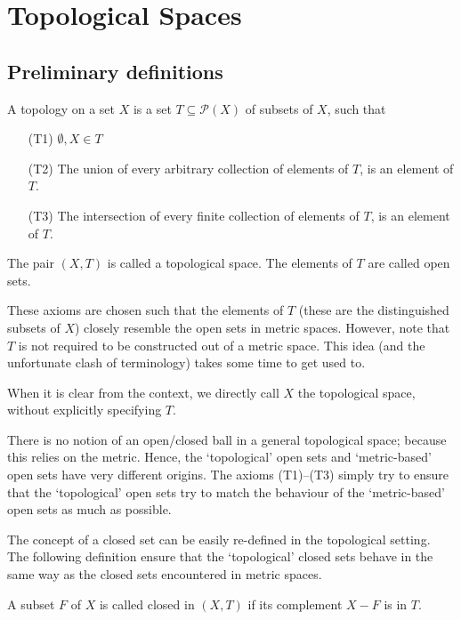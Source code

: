 \section{Topological Spaces}

\subsection{Preliminary definitions}
\begin{ndfn}
  A topology on a set $X$ is a set $T \subseteq \mathcal{P}(X)$ of subsets of $X$, such that
  \begin{enumerate}
  \item[(T1)] $\emptyset, X \in T$
  \item[(T2)] The union of every arbitrary collection of elements of $T$, is an element of $T$.
  \item[(T3)] The intersection of every finite collection of elements of $T$, is an element of $T$.
  \end{enumerate}
  The pair $(X,T)$ is called a topological space. The elements of $T$ are called open sets.
\end{ndfn}

These axioms are chosen such that the elements of $T$ (these are the distinguished subsets of $X$) closely resemble the open sets in metric spaces. However, note that $T$ is not required to be constructed out of a metric space. This idea (and the unfortunate clash of terminology) takes some time to get used to.

\begin{remark}
  When it is clear from the context, we directly call $X$ the topological space, without explicitly specifying $T$.
\end{remark}

\begin{remark}
  There is no notion of an open/closed ball in a general topological space; because this relies on the metric. Hence, the `topological' open sets and `metric-based' open sets have very different origins. The axioms (T1)--(T3) simply try to ensure that the `topological' open sets try to match the behaviour of the `metric-based' open sets as much as possible.
\end{remark}

The concept of a closed set can be easily re-defined in the topological setting. The following definition ensure that the `topological' closed sets behave in the same way as the closed sets encountered in metric spaces.
\begin{ndfn}
  A subset $F$ of $X$ is called closed in $(X,T)$ if its complement $X-F$ is in $T$.
\end{ndfn}

